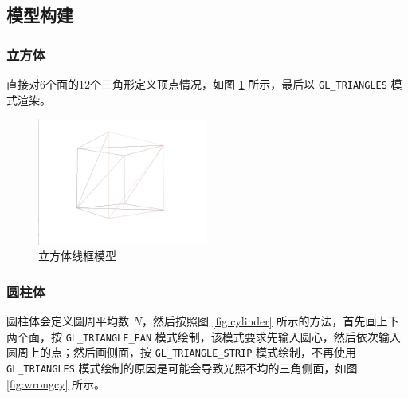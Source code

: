 \documentclass[math-font=newcm]{sjtuarticle}
\begin{document}
\subsection{模型构建}

\subsubsection{立方体}

直接对6个面的12个三角形定义顶点情况，如图 \ref{fig:cube} 所示，最后以 \verb"GL_TRIANGLES" 模式渲染。

\begin{figure}[h]
    \centering
    \includegraphics[width=0.5\textwidth]{cube.png}
    \caption{立方体线框模型}
    \label{fig:cube}
\end{figure}

\subsubsection{圆柱体}

圆柱体会定义圆周平均数 $N$，然后按照图 \ref{fig:cylinder} 所示的方法\cite{cylinder}，首先画上下两个面，按 \verb"GL_TRIANGLE_FAN" 模式绘制，该模式要求先输入圆心，然后依次输入圆周上的点；然后画侧面，按 \verb"GL_TRIANGLE_STRIP" 模式绘制，不再使用 \verb"GL_TRIANGLES" 模式绘制的原因是可能会导致光照不均的三角侧面，如图 \ref{fig:wrongcy} 所示。
\end{document}
